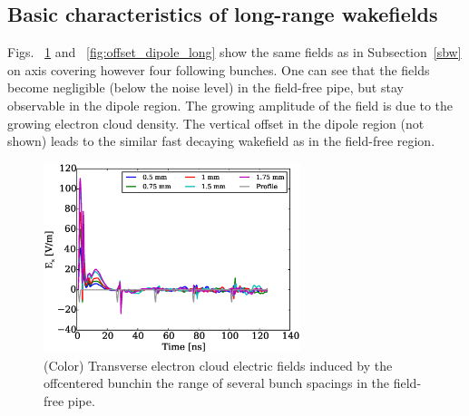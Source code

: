 \documentclass[1p]{elsarticle}%
\begin{document}
\subsection{Basic characteristics of long-range wakefields}

Figs. ~\ref{fig:offset_drift_long} and ~\ref{fig:offset_dipole_long} show the same fields as in Subsection~\ref{sbw} on axis covering however four following bunches.
One can see that the fields become negligible (below the noise level) in the field-free pipe, but stay observable in the dipole region.
The growing amplitude of the field is due to the growing electron cloud density.
The vertical offset in the dipole region (not shown) leads to the similar fast decaying wakefield as in the field-free region.



\begin{figure}[htb] 
\centering
\includegraphics*[width=75mm]{./data/round_drift_offset_long.eps}
\caption{(Color) Transverse electron cloud electric fields induced by the offcentered bunchin the range of several bunch spacings in the field-free pipe.}
\label{fig:offset_drift_long}
\end{figure}
\end{document}
